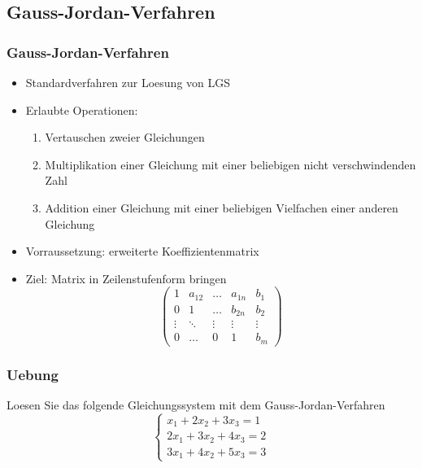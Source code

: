 \subsection{Gauss-Jordan-Verfahren}
\begin{frame}
    \frametitle{Gauss-Jordan-Verfahren}
    \begin{itemize}
        \item Standardverfahren zur Loesung von LGS
        \item Erlaubte Operationen:
        \begin{enumerate}
            \item Vertauschen zweier Gleichungen
            \item Multiplikation einer Gleichung mit einer beliebigen nicht verschwindenden Zahl
            \item Addition einer Gleichung mit einer beliebigen Vielfachen einer anderen Gleichung
        \end{enumerate}
        \item Vorraussetzung: erweiterte Koeffizientenmatrix
        \item Ziel: Matrix in Zeilenstufenform bringen
        \begin{equation*}
            \begin{pmatrix}
                1      & a_{12} & \dots  & a_{1n} & b_1    \\
                0      & 1      & \dots  & b_{2n} & b_2    \\
                \vdots & \ddots & \vdots & \vdots & \vdots \\
                0      & \dots  & 0      & 1      & b_m
            \end{pmatrix}
        \end{equation*}
    \end{itemize}
\end{frame}

\begin{frame}
    \frametitle{Uebung}
    Loesen Sie das folgende Gleichungssystem mit dem Gauss-Jordan-Verfahren
    \begin{equation*}
        \begin{cases}
            x_1 + 2x_2 + 3x_3 = 1 \\
            2x_1 + 3x_2 + 4x_3 = 2 \\
            3x_1 + 4x_2 + 5x_3 = 3
        \end{cases}
    \end{equation*}
\end{frame}

